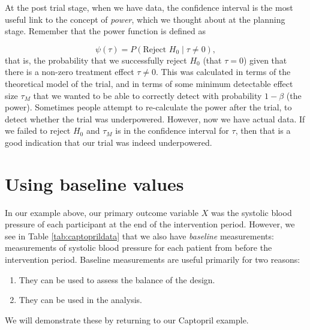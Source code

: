 \documentclass[
  openany]{book}
\providecommand{\tightlist}{%
  \setlength{\itemsep}{0pt}\setlength{\parskip}{0pt}}
\theoremstyle{definition}
\theoremstyle{definition}
\theoremstyle{definition}
\theoremstyle{definition}
\theoremstyle{remark}
\begin{document}
At the post trial stage, when we have data, the confidence interval is the most useful link to the concept of \emph{power}, which we thought about at the planning stage. Remember that the power function is defined as

\[\psi \left(\tau\right) = P\left(\text{Reject }H_0\mid \tau\neq 0\right),\] that is, the probability that we successfully reject \(H_0\) (that \(\tau=0\)) given that there is a non-zero treatment effect \(\tau\neq 0\). This was calculated in terms of the theoretical model of the trial, and in terms of some minimum detectable effect size \(\tau_M\) that we wanted to be able to correctly detect with probability \(1-\beta\) (the power). Sometimes people attempt to re-calculate the power after the trial, to detect whether the trial was underpowered. However, now we have actual data. If we failed to reject \(H_0\) and \(\tau_M\) is in the confidence interval for \(\tau\), then that is a good indication that our trial was indeed underpowered.

\hypertarget{baseline}{%
\section{Using baseline values}\label{baseline}}

In our example above, our primary outcome variable \(X\) was the systolic blood pressure of each participant at the end of the intervention period. However, we see in Table \ref{tab:captoprildata} that we also have \emph{baseline} measurements: measurements of systolic blood pressure for each patient from before the intervention period. Baseline measurements are useful primarily for two reasons:

\begin{enumerate}
\def\labelenumi{\arabic{enumi}.}
\tightlist
\item
  They can be used to assess the balance of the design.
\item
  They can be used in the analysis.
\end{enumerate}

We will demonstrate these by returning to our Captopril example.
\end{document}
